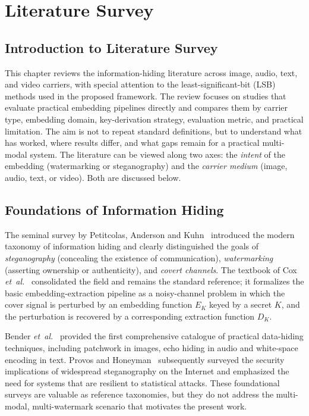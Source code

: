 \chapter{Literature Survey}
\label{Literature_Survey}

\section{Introduction to Literature Survey}

This chapter reviews the information-hiding literature across image, audio, text, and video carriers, with special attention to the least-significant-bit (LSB) methods used in the proposed framework. The review focuses on studies that evaluate practical embedding pipelines directly and compares them by carrier type, embedding domain, key-derivation strategy, evaluation metric, and practical limitation. The aim is not to repeat standard definitions, but to understand what has worked, where results differ, and what gaps remain for a practical multi-modal system. The literature can be viewed along two axes: the \emph{intent} of the embedding (watermarking or steganography) and the \emph{carrier medium} (image, audio, text, or video). Both are discussed below.

\section{Foundations of Information Hiding}

The seminal survey by Petitcolas, Anderson and Kuhn~\cite{petitcolas1999information} introduced the modern taxonomy of information hiding and clearly distinguished the goals of \emph{steganography} (concealing the existence of communication), \emph{watermarking} (asserting ownership or authenticity), and \emph{covert channels}. The textbook of Cox \emph{et~al.}~\cite{cox2007digital} consolidated the field and remains the standard reference; it formalizes the basic embedding-extraction pipeline as a noisy-channel problem in which the cover signal is perturbed by an embedding function $E_K$ keyed by a secret $K$, and the perturbation is recovered by a corresponding extraction function $D_K$.

Bender \emph{et~al.}~\cite{bender1996techniques} provided the first comprehensive catalogue of practical data-hiding techniques, including patchwork in images, echo hiding in audio and white-space encoding in text. Provos and Honeyman~\cite{provos2003hide} subsequently surveyed the security implications of widespread steganography on the Internet and emphasized the need for systems that are resilient to statistical attacks. These foundational surveys are valuable as reference taxonomies, but they do not address the multi-modal, multi-watermark scenario that motivates the present work.

